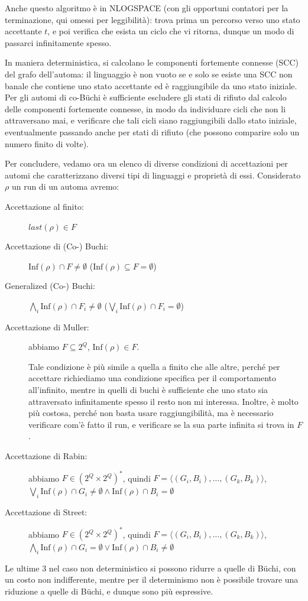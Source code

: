 Anche questo algoritmo è in NLOGSPACE (con gli opportuni contatori per la terminazione, qui omessi per leggibilità): trova prima un percorso verso uno stato accettante \(t\), e poi verifica che esista un ciclo che vi ritorna, dunque un modo di passarci infinitamente spesso.

In maniera deterministica, si calcolano le componenti fortemente connesse (SCC) del grafo dell'automa: il linguaggio è non vuoto se e solo se esiste una SCC non banale che contiene uno stato accettante ed è raggiungibile da uno stato iniziale. Per gli automi di co-Büchi è sufficiente escludere gli stati di rifiuto dal calcolo delle componenti fortemente connesse, in modo da individuare cicli che non li attraversano mai, e verificare che tali cicli siano raggiungibili dallo stato iniziale, eventualmente passando anche per stati di rifiuto (che possono comparire solo un numero finito di volte).

Per concludere, vedamo ora un elenco di diverse condizioni di accettazioni per automi che caratterizzano diversi tipi di linguaggi e proprietà di essi. Considerato \(\rho\) un run di un automa avremo:

\begin{description}
  \item[Accettazione al finito:] \(last(\rho) \in F\)
  \item[Accettazione di (Co-) Buchi:] \(\text{Inf}(\rho) \cap F \neq \emptyset\) (\(\text{Inf}(\rho) \subseteq F = \emptyset\))
  \item[Generalized (Co-) Buchi:] \(\bigwedge_i \text{Inf}(\rho) \cap F_i \neq \emptyset\) (\(\bigvee_i \text{Inf}(\rho) \cap F_i = \emptyset\))
  \item[Accettazione di Muller:] abbiamo \(F\subseteq 2^Q\), \(\text{Inf}(\rho) \in F\).
  
  Tale condizione è più simile a quella a finito che alle altre, perché per accettare richiediamo una condizione specifica per il comportamento all'infinito, mentre in quelli di buchi è sufficiente che uno stato sia attraversato infinitamente spesso il resto non mi interessa. Inoltre, è molto più costosa, perché non basta usare raggiungibilità, ma è necessario verificare com'è fatto il run, e verificare se la sua parte infinita si trova in \(F\).
  \item[Accettazione di Rabin:] abbiamo \(F \in {(2^Q\times 2^Q)}^*\), quindi \(F = \langle (G_i,B_i),\ldots,(G_k, B_k)\rangle\), \(\bigvee_i \text{Inf}(\rho) \cap G_i \neq \emptyset \land \text{Inf}(\rho) \cap B_i = \emptyset\)
  \item[Accettazione di Street:] abbiamo \(F \in {(2^Q\times 2^Q)}^*\), quindi \(F = \langle (G_i,B_i),\ldots,(G_k, B_k)\rangle\), \(\bigwedge_i \text{Inf}(\rho) \cap G_i = \emptyset \lor \text{Inf}(\rho) \cap B_i \neq \emptyset\)
\end{description}

Le ultime 3 nel caso non deterministico si possono ridurre a quelle di Büchi, con un costo non indifferente, mentre per il determinismo non è possibile trovare una riduzione a quelle di Büchi, e dunque sono più espressive.